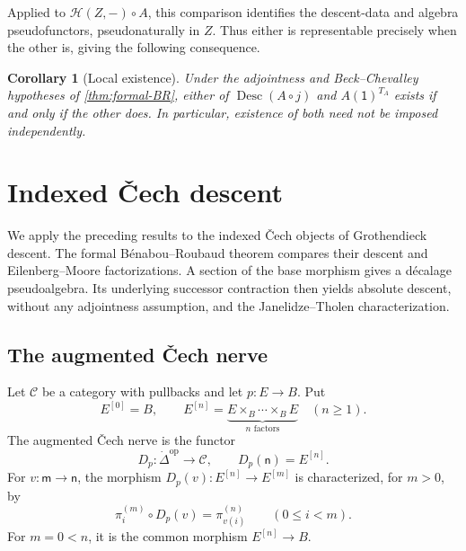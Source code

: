 \documentclass[11pt,a4paper]{article}
\numberwithin{equation}{section}
\newtheorem{corollary}[corollary]{Corollary}
\theoremstyle{definition}
\theoremstyle{remark}
\newcommand{\Hcat}{\mathcal H}
\newcommand{\C}{\mathcal C}
\newcommand{\Desc}{\operatorname{Desc}}
\begin{document}
Applied to $\Hcat(Z,-)\circ A$, this comparison identifies the
descent-data and algebra pseudofunctors, pseudonaturally in $Z$.
Thus either is representable precisely when the other is, giving
the following consequence.

\begin{corollary}[Local existence]
\label{cor:BR-local-existence}
Under the adjointness and Beck--Chevalley hypotheses of
\cref{thm:formal-BR}, either of $\Desc(A\circ j)$ and $A(\mathsf 1)^{T_A}$
exists if and only if the other does. In particular, existence of
both need not be imposed independently.
\end{corollary}

\section{Indexed \v{C}ech descent}
\label{sec:split}

We apply the preceding results to the indexed \v{C}ech objects of
Grothendieck descent. The formal B\'enabou--Roubaud theorem compares
their descent and Eilenberg--Moore factorizations. A section of the
base morphism gives a d\'ecalage pseudoalgebra. Its underlying
successor contraction then yields absolute descent, without any
adjointness assumption, and the Janelidze--Tholen characterization.

\subsection{The augmented \v{C}ech nerve}

Let $\C$ be a category with pullbacks and let $p\colon E\to B$. Put
\begin{equation}
  E^{[0]}=B,
  \qquad
  E^{[n]}=
  \underbrace{E\times_B\cdots\times_BE}_{n\text{ factors}}
  \quad(n\geq1).
  \label{eq:cech-powers}
\end{equation}
The augmented \v{C}ech nerve is the functor
\begin{equation}
  D_p\colon\dot\Delta^{\mathrm{op}}\longrightarrow\C,
  \qquad
  D_p(\mathsf n)=E^{[n]}.
  \label{eq:cech-nerve}
\end{equation}
For $v\colon\mathsf m\to\mathsf n$, the morphism
$D_p(v)\colon E^{[n]}\to E^{[m]}$ is characterized, for $m>0$, by
\[
  \pi_i^{(m)}\circ D_p(v)=\pi_{v(i)}^{(n)}
  \qquad(0\leq i<m).
\]
For $m=0<n$, it is the common morphism $E^{[n]}\to B$.
\end{document}
